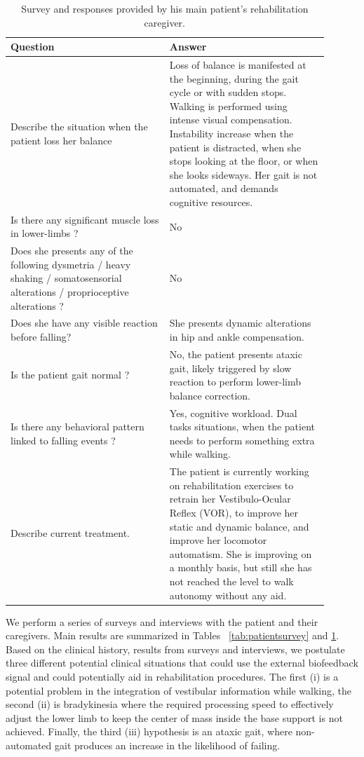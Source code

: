\documentclass[conference]{IEEEtran}
\begin{document}
\begin{table}[t]
\begin{center}
\begin{tabular}[!t]{|p{0.45\linewidth} |p{0.45\linewidth} |}
\hline
\textbf{Question} &  \textbf{Answer} \\
\hline
\hline
Describe the situation when the patient loss her balance & Loss of balance is manifested at the beginning, during the gait cycle or with sudden stops. Walking is performed using intense visual compensation.   Instability increase when the patient is distracted, when she stops looking at the floor, or when she looks sideways.  Her gait is not automated, and demands cognitive resources. \\
\hline
Is there any significant muscle loss in lower-limbs ? & No\\
\hline
Does she presents any of the following dysmetria / heavy shaking / somatosensorial alterations / proprioceptive alterations ? & No \\
\hline
Does she have any visible reaction before falling?  & She presents dynamic alterations in hip and ankle compensation.\\
\hline
Is the patient gait normal ?  &  No, the patient presents ataxic gait, likely triggered by slow reaction to perform lower-limb balance correction. \\
\hline
Is there any behavioral pattern linked to falling events ? &  Yes, cognitive workload.  Dual tasks situations, when the patient needs to perform something extra while walking. \\
\hline
Describe current treatment. & The patient is currently working on rehabilitation exercises to retrain her Vestibulo-Ocular Reflex (VOR), to improve her static and dynamic balance, and improve her locomotor automatism.  She is improving on a monthly basis, but still she has not reached the level to walk autonomy without any aid. \\
\hline
\end{tabular}
\vspace{2pt}
\caption{Survey and responses provided by his main patient's rehabilitation caregiver.}
\label{tab:caregiverssurvey}
\end{center}
\end{table}

We perform a series of surveys and interviews with the patient and their caregivers.  Main results are summarized in 
Tables ~\ref{tab:patientsurvey} and \ref{tab:caregiverssurvey}.  Based on the clinical history, results from surveys and interviews, we postulate three different potential clinical situations that could use the external biofeedback signal and could potentially aid in rehabilitation procedures.  The first (i) is a potential problem in the integration of vestibular information while walking, the second (ii) is bradykinesia where the required processing speed to effectively adjust the lower limb to keep the center of mass inside the base support is not achieved.  Finally, the third (iii) hypothesis is an ataxic gait, where non-automated gait produces an increase in the likelihood of failing.
\end{document}
